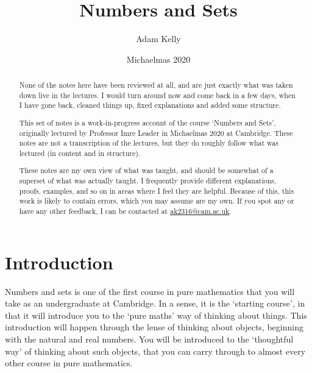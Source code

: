 \documentclass[a4]{scrartcl}
\title{Numbers and Sets}
\author{Adam Kelly}
\date{Michaelmas 2020}
\begin{document}
\maketitle

\begin{abstract}
	{\color{red} None of the notes here have been reviewed at all, and are just exactly what was taken down live in the lectures. I would turn around now and come back in a few days, when I have gone back, cleaned things up, fixed explanations and added some structure.}
	\vspace{5\baselineskip}



	This set of notes is a work-in-progress account of the course `Numbers and Sets', originally lectured by Professor Imre Leader in Michaelmas 2020 at Cambridge. These notes are not a transcription of the lectures, but they do roughly follow what was lectured (in content and in structure).

	These notes are my own view of what was taught, and should be somewhat of a superset of what was actually taught. I frequently provide different explanations, proofs, examples, and so on in areas where I feel they are helpful. Because of this, this work is likely to contain errors, which you may assume are my own. If you spot any or have any other feedback, I can be contacted at \href{mailto:ak2316@cam.ac.uk}{ak2316@cam.ac.uk}.


\end{abstract}

\tableofcontents

\clearpage
\section{Introduction}

Numbers and sets is one of the first course in pure mathematics that you will take
as an undergraduate at Cambridge. In a sense, it is the `starting course', in that it will introduce you to the `pure maths' way of thinking about things. 
This introduction will happen through the lense of thinking about objects, beginning with the natural and real numbers. You will be introduced to the `thoughtful way' of thinking about such objects, that you can carry through to almost every other course in pure mathematics.
\end{document}
